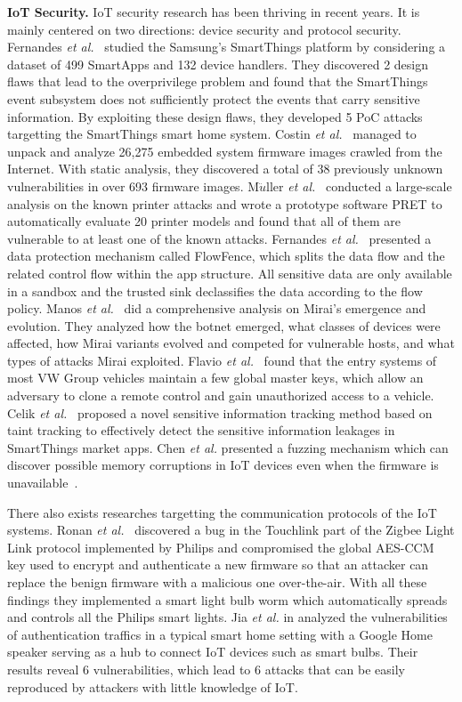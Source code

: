 \documentclass[letterpaper,12pt]{article}
\begin{document}
\textbf{IoT Security.}
IoT security research has been thriving in recent years. It is mainly centered on two directions: device security and protocol security. Fernandes \emph{et al.}~\cite{fernandes2016security} studied the Samsung's SmartThings platform by considering a dataset of 499 SmartApps and 132 device handlers. They discovered 2 design flaws that lead to the overprivilege problem and found that the SmartThings event subsystem does not sufficiently protect the events that carry sensitive information. By exploiting these design flaws, they developed 5 PoC attacks targetting the SmartThings smart home system.  Costin \emph{et al.}~\cite{costin2014large} managed to unpack and analyze 26,275 embedded system firmware images crawled from the Internet. With static analysis, they discovered a total of 38 previously unknown vulnerabilities in over 693 firmware images. M$\ddot{u}$ller \emph{et al.}~\cite{muller2017sok} conducted a large-scale analysis on the known printer attacks and wrote a prototype software PRET to automatically evaluate 20 printer models and found that all of them are vulnerable to at least one of the known attacks. Fernandes \emph{et al.}~\cite{fernandes2016flowfence} presented a data protection mechanism called FlowFence, which splits the data flow and the related control flow within the app structure. All sensitive data are only available in a sandbox and the trusted sink declassifies the data according to the flow policy. Manos \emph{et al.}~\cite{antonakakis2017understanding} did a comprehensive analysis on Mirai's emergence and evolution. They analyzed how the botnet emerged, what classes of devices were affected, how Mirai variants evolved and competed for vulnerable hosts, and what types of attacks Mirai exploited. Flavio \emph{et al.}~\cite{garcia2016lock} found that the entry systems of most VW Group vehicles maintain a few global master keys, which allow an adversary to clone a remote control and gain unauthorized access to a vehicle. Celik \emph{et al.}~\cite{celik2018saint} proposed a novel sensitive information tracking method based on taint tracking to effectively detect the sensitive information leakages in SmartThings market apps. Chen \emph{et al.} presented a fuzzing mechanism which can discover possible memory corruptions in IoT devices even when the firmware is unavailable~\cite{chen2018iotfuzzer}.

There also exists researches targetting the communication protocols of the IoT systems. Ronan \emph{et al.}~\cite{ronen2017iot} discovered a bug in the Touchlink part of the Zigbee Light Link protocol implemented by Philips and compromised the global AES-CCM key used to encrypt and authenticate a new firmware so that an attacker can replace the benign firmware with a malicious one over-the-air. With all these findings they implemented a smart light bulb worm which automatically spreads and controls all the Philips smart lights. Jia \emph{et al.} in \cite{jia2018traffic} analyzed the vulnerabilities of authentication traffics in a typical smart home setting with a Google Home speaker serving as a hub to connect IoT devices such as smart bulbs.  Their results reveal 6 vulnerabilities, which lead to 6 attacks that can be easily reproduced by attackers with little knowledge of IoT.
\end{document}
